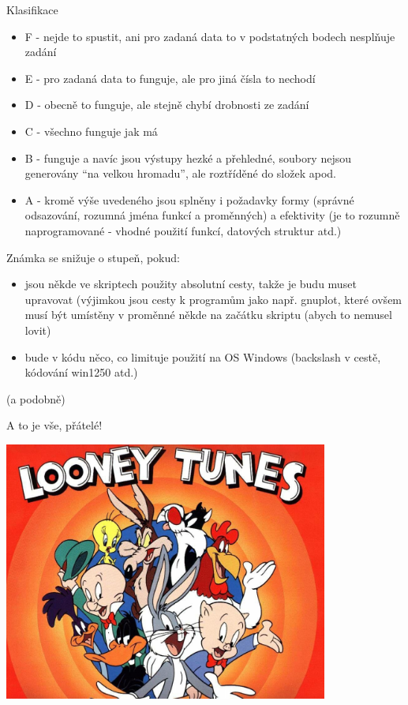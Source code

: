 \documentclass{beamer}
\begin{document}
\begin{frame}{Klasifikace}
  \begin{itemize}
    \item F - nejde to spustit, ani pro zadaná data to v podstatných bodech nesplňuje zadání
    \item E - pro zadaná data to funguje, ale pro jiná čísla to nechodí
    \item D - obecně to funguje, ale stejně chybí drobnosti ze zadání
    \item C - všechno funguje jak má
    \item B - funguje a navíc jsou výstupy hezké a přehledné, soubory nejsou generovány “na velkou hromadu”, ale roztříděné do složek apod.
    \item A - kromě výše uvedeného jsou splněny i požadavky formy (správné odsazování, rozumná jména funkcí a proměnných) a efektivity (je to rozumně naprogramované - vhodné použití funkcí, datových struktur atd.)
  \end{itemize}
\end{frame}

\begin{frame}{Známka se snižuje o stupeň, pokud:}
  \begin{itemize}
    \item jsou někde ve skriptech použity absolutní cesty, takže je budu muset upravovat (výjimkou jsou cesty k programům jako např. gnuplot, které ovšem musí být umístěny v proměnné někde na začátku skriptu (abych to nemusel lovit)
    \item bude v kódu něco, co limituje použití na OS Windows (backslash v cestě, kódování win1250 atd.)
  \end{itemize}
  (a podobně)
\end{frame}


\begin{frame}{A to je vše, přátelé!}
  \begin{center}
    \includegraphics[width=0.8\textwidth]{looney_tunes}
  \end{center}
\end{frame}
\end{document}
